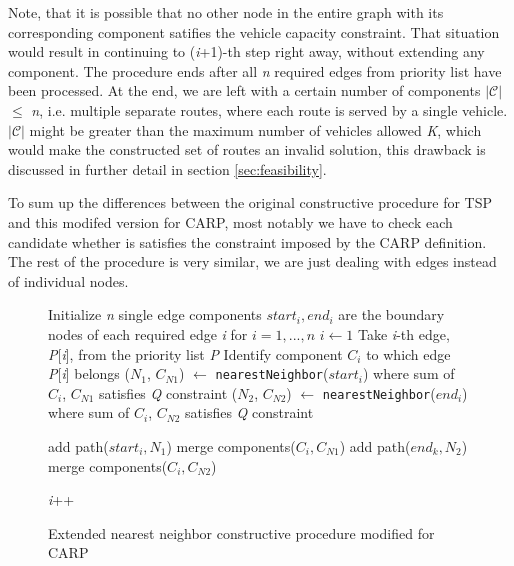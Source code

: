 \documentclass[twoside]{ctuthesis}
\theoremstyle{plain}
\theoremstyle{definition}
\theoremstyle{note}
\begin{document}
Note, that it is possible that no other node in the entire graph with its corresponding component satifies the vehicle capacity constraint. That situation would result in continuing to (\emph{i}+1)-th step right away, without extending any component. The procedure ends after all \emph{n} required edges from priority list have been processed. At the end, we are left with a certain number of components \emph{$\mathcal{|C|}$} $\leq$ \emph{n}, i.e. multiple separate routes, where each route is served by a single vehicle. \emph{$\mathcal{|C|}$} might be greater than the maximum number of vehicles allowed \emph{K}, which would make the constructed set of routes an invalid solution, this drawback is discussed in further detail in section \ref{sec:feasibility}.

To sum up the differences between the original constructive procedure for TSP and this modifed version for CARP, most notably we have to check each candidate whether is satisfies the constraint imposed by the CARP definition. The rest of the procedure is very similar, we are just dealing with edges instead of individual nodes.



	
\begin{figure}
\begin{algorithmic}[1]
	\State Initialize \emph{n} single edge components \emph{$ start_i, end_i $} are the boundary nodes of each required edge \emph{i} for \emph{$ i = 1, ..., n $}
	\State $i \gets 1$
	\State Take \emph{i}-th edge, \emph{P}[\emph{i}], from the priority list \emph{P}
	\State Identify component \emph{$ C_i $} to which edge \emph{P}[\emph{i}] belongs
	\State (\emph{$N_1$}, \emph{$C_{N1}$}) $\gets$  {\tt nearestNeighbor}(\emph{$ start_i $}) where sum of \emph{$ C_i $}, \emph{$C_{N1}$} satisfies \emph{Q} constraint
	\State (\emph{$N_2$}, \emph{$C_{N2}$}) $\gets$  {\tt nearestNeighbor}(\emph{$ end_i $}) where sum of \emph{$ C_i $}, \emph{$C_{N2}$} satisfies \emph{Q} constraint
	
		\State add path(\emph{$ start_i, N_1 $})
		\State merge components(\emph{$C_i, C_{N1}$})
	\Else
		\State add path(\emph{$ end_k, N_2 $})
		\State merge components(\emph{$C_i, C_{N2}$})
	\EndIf
	
	\State \emph{i}++
	\EndWhile
	
	
\end{algorithmic}
	\caption{Extended nearest neighbor constructive procedure modified for CARP}
\label{fig:cnnpcarp}
\end{figure}
\end{document}
